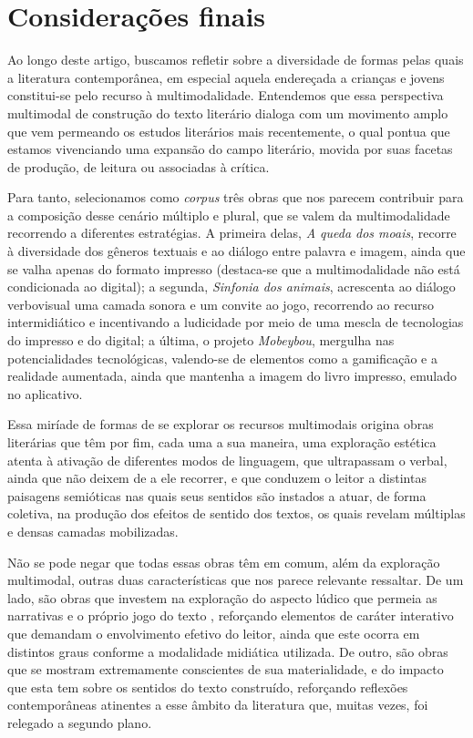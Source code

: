 \documentclass[portuguese]{textolivre}
\begin{document}
\section{Considerações finais}\label{sec-modelo}

Ao longo deste artigo, buscamos refletir sobre a diversidade de formas pelas
quais a literatura contemporânea, em especial aquela endereçada a crianças e
jovens constitui-se pelo recurso à multimodalidade. Entendemos que essa
perspectiva multimodal de construção do texto literário dialoga com um
movimento amplo que vem permeando os estudos literários mais recentemente, o
qual pontua que estamos vivenciando uma expansão do campo literário, movida por
suas facetas de produção, de leitura ou associadas à crítica.

Para tanto, selecionamos como \textit{corpus} três obras que nos parecem
contribuir para a composição desse cenário múltiplo e plural, que se valem da
multimodalidade recorrendo a diferentes estratégias. A primeira delas,
\textit{A queda dos moais}, recorre à diversidade dos gêneros textuais e ao
diálogo entre palavra e imagem, ainda que se valha apenas do formato impresso
(destaca-se que a multimodalidade não está condicionada ao digital); a segunda,
\textit{Sinfonia dos animais}, acrescenta ao diálogo verbovisual uma camada
sonora e um convite ao jogo, recorrendo ao recurso intermidiático e
incentivando a ludicidade por meio de uma mescla de tecnologias do impresso e
do digital; a última, o projeto \textit{Mobeybou}, mergulha nas potencialidades
tecnológicas, valendo-se de elementos como a gamificação e a realidade
aumentada, ainda que mantenha a imagem do livro impresso, emulado no
aplicativo.

Essa miríade de formas de se explorar os recursos multimodais origina obras
literárias que têm por fim, cada uma a sua maneira, uma exploração estética
atenta à ativação de diferentes modos de linguagem, que ultrapassam o verbal,
ainda que não deixem de a ele recorrer, e que conduzem o leitor a distintas
paisagens semióticas nas quais seus sentidos são instados a atuar, de forma
coletiva, na produção dos efeitos de sentido dos textos, os quais revelam
múltiplas e densas camadas mobilizadas. 

Não se pode negar que todas essas obras têm em comum, além da exploração
multimodal, outras duas características que nos parece relevante ressaltar. De
um lado, são obras que investem na exploração do aspecto lúdico que permeia as
narrativas e o próprio jogo do texto \cite{iser_o_1979}, reforçando elementos
de caráter interativo que demandam o envolvimento efetivo do leitor, ainda que
este ocorra em distintos graus conforme a modalidade midiática utilizada. De
outro, são obras que se mostram extremamente conscientes de sua materialidade,
e do impacto que esta tem sobre os sentidos do texto construído, reforçando
reflexões contemporâneas atinentes a esse âmbito da literatura que, muitas
vezes, foi relegado a segundo plano. 
\end{document}
